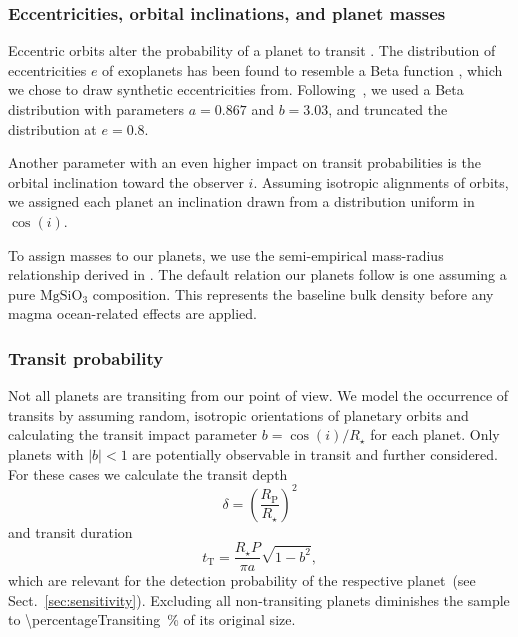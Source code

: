 \documentclass[modern]{aastex631}
\begin{document}
\subsubsection{Eccentricities, orbital inclinations, and planet masses}
Eccentric orbits alter the probability of a planet to transit \citep[e.g.,][]{Barnes2007a}.
The distribution of eccentricities $e$ of exoplanets has been found to resemble a Beta function \citep{Kipping2013b}, which we chose to draw synthetic eccentricities from.
Following~\citet{Kipping2013b}, we used a Beta distribution with parameters $a=0.867$ and $b=3.03$, and truncated the distribution at $e = 0.8$.

Another parameter with an even higher impact on transit probabilities is the orbital inclination toward the observer $i$.
Assuming isotropic alignments of orbits, we assigned each planet an inclination drawn from a distribution uniform in $\cos(i)$.

To assign masses to our planets, we use the semi-empirical mass-radius relationship derived in \citet{Zeng2016}.
The default relation our planets follow is one assuming a pure $\mathrm{MgSiO_3}$ composition.
This represents the baseline bulk density before any magma ocean-related effects are applied.


\subsubsection{Transit probability}
\begin{note}
    Not all planets are transiting from our point of view.
    We model the occurrence of transits by assuming random, isotropic orientations of planetary orbits and calculating the transit impact parameter $b = \cos(i)/R_\star$ for each planet.
    Only planets with $|b| < 1$ are potentially observable in transit and further considered.
    For these cases we calculate the transit depth
    \begin{equation}\label{eq:transitdepth}
        \delta = \left( \frac{R_\mathrm{P}}{R_\star} \right)^2
    \end{equation}
    and transit duration
    \begin{equation}\label{eq:transitduration}
        t_{\mathrm{T}} = \frac{R_\star P}{\pi a} \sqrt{1 - b^2},
    \end{equation}
    which are relevant for the detection probability of the respective planet~(see Sect.~\ref{sec:sensitivity}).
    Excluding all non-transiting planets diminishes the sample to \SI{\percentageTransiting}{\percent} of its original size.
\end{note}
\end{document}
